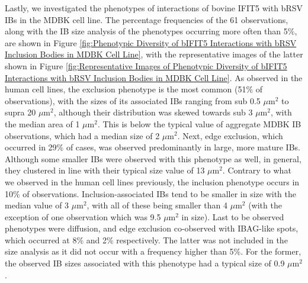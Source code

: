 Lastly, we investigated the phenotypes of interactions of bovine IFIT5 with bRSV IBs in the MDBK cell line. The percentage frequencies of the 61 observations, along with the IB size analysis of the phenotypes occurring more often than 5\%, are shown in Figure \ref{fig:Phenotypic Diversity of bIFIT5 Interactions with bRSV Inclusion Bodies in MDBK Cell Line}, with the representative images of the latter shown in Figure \ref{fig:Representative Images of Phenotypic Diversity of bIFIT5 Interactions with bRSV Inclusion Bodies in MDBK Cell Line}. As observed in the human cell lines, the exclusion phenotype is the most common (51\% of observations), with the sizes of its associated IBs ranging from sub 0.5 \(\mu \mbox{m}^2\) to supra 20 \(\mu \mbox{m}^2\), although their distribution was skewed towards sub 3 \(\mu \mbox{m}^2\), with the median area of 1 \(\mu \mbox{m}^2\). This is below the typical value of aggregate MDBK IB observations, which had a median size of 2 \(\mu \mbox{m}^2\). Next, edge exclusion, which occurred in 29\% of cases, was observed predominantly in large, more mature IBs. Although some smaller IBs were observed with this phenotype as well, in general, they clustered in line with their typical size value of 13 \(\mu \mbox{m}^2\). Contrary to what we observed in the human cell lines previously, the inclusion phenotype occurs in 10\% of observations. Inclusion-associated IBs tend to be smaller in size with the median value of 3 \(\mu \mbox{m}^2\), with all of these being smaller than 4 \(\mu \mbox{m}^2\) (with the exception of one observation which was 9.5 \(\mu \mbox{m}^2\) in size). Last to be observed phenotypes were diffusion, and edge exclusion co-observed with IBAG-like spots, which occurred at 8\% and 2\% respectively. The latter was not included in the size analysis as it did not occur with a frequency higher than 5\%. For the former, the observed IB sizes associated with this phenotype had a typical size of 0.9 \(\mu \mbox{m}^2\).


